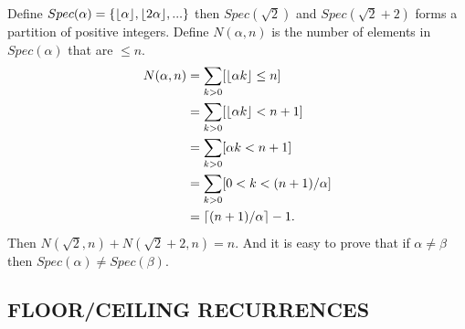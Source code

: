 \documentclass{article}
\DeclarePairedDelimiter\ceil{\lceil}{\rceil}
\DeclarePairedDelimiter\floor{\lfloor}{\rfloor}
\begin{document}
Define $Spec(\alpha) = \{\floor{\alpha}, \floor{2\alpha},...\}$ then $Spec(\sqrt{2})$ and $Spec(\sqrt{2}+2)$ forms a partition of positive integers.
Define $N(\alpha,n)$ is the number of elements in $Spec(\alpha)$ that are $\le n$.
\begin{align}
N(\alpha,n) &= \sum_{k>0}[\floor{\alpha k} \le n] \\
	    &= \sum_{k>0}[\floor{\alpha k} < n + 1] \\
	    &= \sum_{k>0}[\alpha k < n + 1] \\
	    &= \sum_{k>0}[ 0 < k < (n + 1)/\alpha] \\
	    &= \ceil{(n+1)/\alpha} - 1.
\end{align}
Then $N(\sqrt{2}, n) + N(\sqrt{2}+2, n) = n$. 
And it is easy to prove that if $\alpha \neq \beta$ then $Spec(\alpha) \neq Spec(\beta)$.
\subsection{FLOOR/CEILING RECURRENCES}
\end{document}
